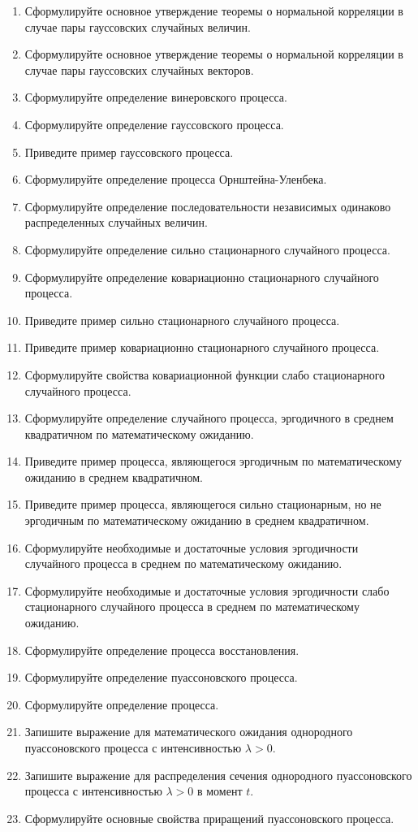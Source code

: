 \documentclass[a4paper,12pt]{extreport}
\renewcommand{\=}[1]{\stackrel{#1}{=}} %
\begin{document}
\begin{enumerate}
	\item Сформулируйте основное утверждение теоремы о нормальной корреляции
	в случае пары гауссовских случайных величин.
	\item Сформулируйте основное утверждение теоремы о нормальной корреляции
	в случае пары гауссовских случайных векторов.

	\item Сформулируйте определение винеровского процесса.
	\item Сформулируйте определение гауссовского процесса.
	\item Приведите пример гауссовского процесса.
	\item Сформулируйте определение процесса Орнштейна-Уленбека.

	\item Сформулируйте определение последовательности независимых 
	одинаково распределенных случайных величин.
	\item Сформулируйте определение сильно стационарного случайного процесса.
	\item Сформулируйте определение ковариационно стационарного случайного процесса.
	\item Приведите пример сильно стационарного случайного процесса.
	\item Приведите пример ковариационно стационарного случайного процесса.
	\item Сформулируйте свойства ковариационной функции 
	слабо стационарного случайного процесса.
	\item Сформулируйте определение случайного процесса,
	эргодичного в среднем квадратичном по математическому ожиданию.
	\item Приведите пример процесса, являющегося эргодичным по математическому ожиданию
	в среднем квадратичном.
	\item Приведите пример процесса, являющегося сильно стационарным, 
	но не эргодичным по математическому ожиданию
	в среднем квадратичном.
	\item Сформулируйте необходимые и достаточные условия эргодичности
	случайного процесса в среднем по математическому ожиданию.
	\item Сформулируйте необходимые и достаточные условия эргодичности
	слабо стационарного случайного процесса в среднем по математическому ожиданию.

	\item Сформулируйте определение процесса восстановления.
	\item Сформулируйте определение пуассоновского процесса.
	\item Сформулируйте определение процесса.
	\item Запишите выражение для математического ожидания
	однородного пуассоновского процесса с интенсивностью $\lambda > 0$.
	\item Запишите выражение для распределения сечения
	однородного пуассоновского процесса с интенсивностью $\lambda > 0$
	в момент $t$.
	\item Сформулируйте основные свойства приращений пуассоновского процесса.


\end{enumerate}
\end{document}
